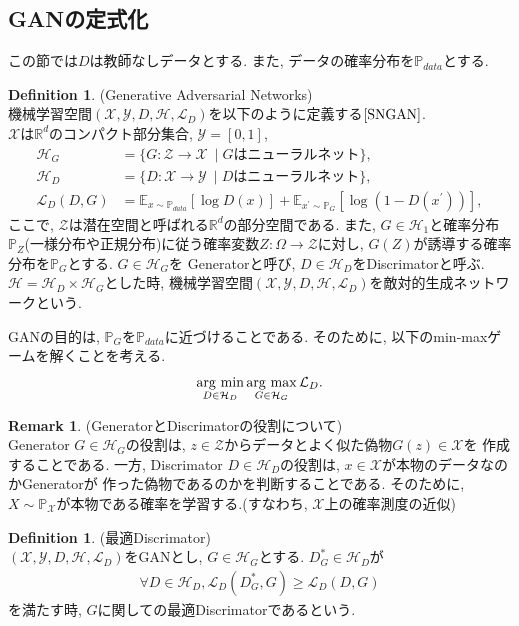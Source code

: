 \documentclass[11pt, a4paper, dvipdfmx]{jsarticle}
\theoremstyle{definition}
\newtheorem{Definition+}[Axiom+]{Definition}
\newtheorem{Remark+}[Axiom+]{Remark}
\newcommand{\R}{\mathbb{R}}
\newcommand{\X}{\mathcal{X}}
\newcommand{\Y}{\mathcal{Y}}
\newcommand{\Hil}{\mathcal{H}}
\newcommand{\Loss}{\mathcal{L}_{D}}
\newcommand{\MLsp}{(\X, \Y, D, \Hil, \Loss)}
\newcommand{\argmax}{\mathop{\rm arg~max}\limits}
\newcommand{\argmin}{\mathop{\rm arg~min}\limits}
\begin{document}
\subsection{GANの定式化}
この節では$D$は教師なしデータとする. また, データの確率分布を$\mathbb{P}_{data}$とする. 
\begin{Definition+}(Generative Adversarial Networks)\\
    機械学習空間$\MLsp$を以下のように定義する$\cite{SNGAN}$. \\ 
    $\X\text{は}\R^{d}\text{のコンパクト部分集合}$, $\Y = [0, 1]$, 
    \begin{align*}
        \Hil_{G} &= \{G:\mathcal{Z}\to\X~\mid G\text{はニューラルネット}\},\\
        \Hil_{D} &= \{D:\X\to\Y~\mid D\text{はニューラルネット}\},\\
        \Loss(D, G) &= \mathbb{E}_{x\sim \mathbb{P}_{data}}[\log D(x)] + \mathbb{E}_{x^{\prime}\sim \mathbb{P}_{G}}[\log(1 - D(x^{\prime}))],
    \end{align*}
    ここで, $\mathcal{Z}$は潜在空間と呼ばれる$\R^d$の部分空間である. 
    また, $G\in\Hil_{1}$と確率分布$\mathbb{P}_{Z}$(一様分布や正規分布)に従う確率変数$Z:\Omega\to\mathcal{Z}$に対し, $G(Z)$が誘導する確率分布を$\mathbb{P}_{G}$とする. $G\in\Hil_{G}$を
    Generatorと呼び, $D\in\Hil_{D}$をDiscrimatorと呼ぶ.
    $\Hil = \Hil_{D}\times\Hil_{G}$とした時, 機械学習空間$\MLsp$を敵対的生成ネットワークという. 
\end{Definition+}
GANの目的は, $\mathbb{P}_{G}$を$\mathbb{P}_{data}$に近づけることである. そのために, 以下のmin-maxゲームを解くことを考える. 
\begin{align*}
    \argmin_{D\in\Hil_{D}}\argmax_{G\in\Hil_{G}}\Loss.
\end{align*}
\begin{Remark+}(GeneratorとDiscrimatorの役割について)\\
    Generator $G\in\Hil_{G}$の役割は, $z\in\mathcal{Z}$からデータとよく似た偽物$G(z)\in\X$を
    作成することである. 一方, Discrimator $D\in\Hil_{D}$の役割は, $x\in\X$が本物のデータなのかGeneratorが
    作った偽物であるのかを判断することである. そのために, $X\sim\mathbb{P}_{\X}$が本物である確率を学習する.(すなわち, $\X$上の確率測度の近似)
\end{Remark+}
\begin{Definition+}(最適Discrimator)\\
    $\MLsp$をGANとし, $G\in\Hil_{G}$とする. $D_{G}^{*}\in\Hil_{D}$が
    \begin{align*}
        \forall D\in\Hil_{D}, \Loss(D_{G}^{*}, G) \geq \Loss(D, G)
    \end{align*}
    を満たす時, $G$に関しての最適Discrimatorであるという.
\end{Definition+}
\end{document}
